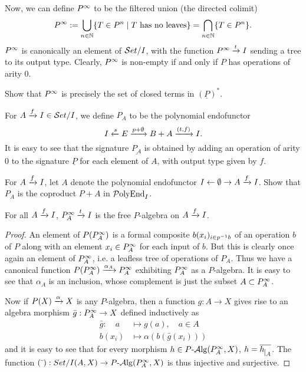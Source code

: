 Now, we can define $P^{\moo}$ to be the filtered union (the directed colimit)
\[
    P^\moo := \bigcup_{n\in\NN} \{ T\in P^n \ssep T \text{ has no leaves} \} =
    \bigcap_{n\in\NN} \{ T\in P^n \}.
\]
$P^\moo$ is canonically an element of $\Set/I$, with the function
$P^\moo\xto{t}I$ sending a tree to its output type. Clearly, $P^\moo$ is
non-empty if and only if $P$ has operations of arity $0$.

\begin{exercise}
    Show that $P^\moo$ is precisely the set of closed terms in $(\underline{P})^*$.
\end{exercise}

For $A\xto{f} I \in \Set/I$, we define $P_A$ to be the polynomial endofunctor
\[
    I\xot{s} E\xto{p+\emptyset} B+A \xto{(t,f)} I.
\]
It is easy to see that the signature $\underline{P_A}$ is obtained by adding an
operation of arity $0$ to the signature $\underline{P}$ for each element of $A$,
with output type given by $f$.

\begin{exercise}
    For $A\xto{f} I$, let $A$ denote the polynomial endofunctor
    $I\ot\emptyset\to A\xto{f} I$. Show that $P_A$ is the coproduct $P+A$ in
    $\PolyEnd_I$.
\end{exercise}

\begin{lemma} \label{lemma:free-algebra}
    For all $A\xto{f}I$, $P_A^\moo\xto{t}I$ is the free $P$-algebra on
    $A\xto{f}I$.
\end{lemma}
\begin{proof}
    An element of $P(P_A^\moo)$ is a formal composite $b(x_i)_{i\in p\inv b}$ of
    an operation $b$ of $P$ along with an element $x_i\in P_A^\moo$ for each
    input of $b$. But this is clearly once again an element of $P_A^\moo$, i.e.
    a leafless tree of operations of $P_A$. Thus we have a canonical function
    $P(P_A^\moo)\xto{\alpha_A} P_A^\moo$ exhibiting $P_A^\moo$ as a $P$-algebra.
    It is easy to see that $\alpha_A$ is an inclusion, whose complement is just
    the subset $A\subset P_A^\moo$.

    Now if $P(X)\xto{\alpha} X$ is any $P$-algebra, then a function $g:A\to X$
    gives rise to an algebra morphism $\bar{g}:P_A^\moo\to X$ defined
    inductively as
    \begin{align*}
      \bar{g} :  \quad a &\mapsto g(a),\quad a\in A \\
      b(x_i) &\mapsto \alpha(b(\bar{g}(x_i)))
    \end{align*}
    and it is easy to see that for every morphism $h\in P\alg(P_A^\moo,X)$,
    $h=\overline{h\restr A}$. The function $(\bar{\ }):Set/I(A,X)\to
    P\alg(P_A^\moo,X)$ is thus injective and surjective.
\end{proof}

